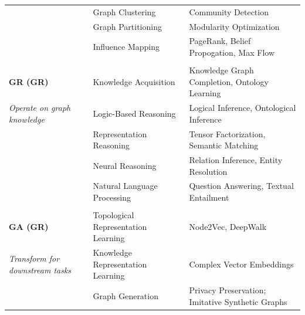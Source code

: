 \begin{landscape}
\begin{table}[t]
\begin{center}
{\begin{tabular}{lll}
                & Graph Clustering         & Community Detection\\%
                                                    & Graph Partitioning       & Modularity Optimization\\%
                                                    & Influence Mapping        & PageRank, Belief Propogation, Max Flow\\%
                                            
                & & \\
                \textbf{\acl{GR} (\acs{GR})} & Knowledge Acquisition    & Knowledge Graph Completion, Ontology Learning\\%
                \textit{Operate on graph knowledge}~\cite{Ji2021,Maedche2004,Chen2020,Bosselut2019,Perevalov2022,Blagec2022} & Logic-Based Reasoning    & Logical Inference, Ontological Inference\\%
                                            & Representation Reasoning & Tensor Factorization, Semantic Matching\\%
                                            & Neural Reasoning         & Relation Inference, Entity Resolution\\%
                                            & Natural Language Processing& Question Answering, Textual Entailment\\%
                & & \\
                \textbf{\acl{GA} (\acs{GR})}  & Topological Representation Learning  & Node2Vec, DeepWalk\\%
                \textit{Transform for downstream tasks}~\cite{Grover2016,Perozzi2014,Ji2021,Du2021,Bonifati2020,Tsitsulin2022,Maekawa2019,Maekawa2023,Zahirnia2024,Blagec2022} & Knowledge Representation Learning & Complex Vector Embeddings\\%
                                            & Graph Generation                     & Privacy Preservation; Imitative Synthetic Graphs              \\             

\end{tabular}}
\end{center}
\end{table}
\end{landscape}
